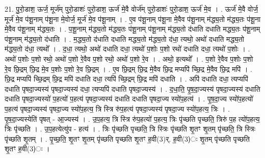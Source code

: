 \documentclass[17pt]{extarticle}
\begin{document}
21. पु॒रो॒डाश॒ ऊर्ज॒ मूर्ज॑म् पुरो॒डाशः॑ पुरो॒डाश॒ ऊर्ज॑ मे॒वै वोर्ज॑म् पुरो॒डाशः॑ पुरो॒डाश॒ ऊर्ज॑ मे॒व । . ऊर्ज॑ मे॒वै वोर्ज॒ मूर्ज॑ मे॒व प॑शू॒नाम् प॑शू॒ना मे॒वोर्ज॒ मूर्ज॑ मे॒व प॑शू॒नाम् । . ए॒व प॑शू॒नाम् प॑शू॒ना मे॒वैव प॑शू॒नाम् म॑द्ध्य॒तो म॑द्ध्य॒तः प॑शू॒ना मे॒वैव प॑शू॒नाम् म॑द्ध्य॒तः । . प॒शू॒नाम् म॑द्ध्य॒तो म॑द्ध्य॒तः प॑शू॒नाम् प॑शू॒नाम् म॑द्ध्य॒तो द॑धाति दधाति मद्ध्य॒तः प॑शू॒नाम् प॑शू॒नाम् म॑द्ध्य॒तो द॑धाति । . म॒द्ध्य॒तो द॑धाति दधाति मद्ध्य॒तो म॑द्ध्य॒तो द॑धा॒ त्यथो॒ अथो॑ दधाति मद्ध्य॒तो म॑द्ध्य॒तो द॑धा॒ त्यथो᳚ । . द॒धा॒ त्यथो॒ अथो॑ दधाति दधा॒ त्यथो॑ प॒शोः प॒शो रथो॑ दधाति दधा॒ त्यथो॑ प॒शोः । . अथो॑ प॒शोः प॒शो रथो॒ अथो॑ प॒शो रे॒वैव प॒शो रथो॒ अथो॑ प॒शो रे॒व । . अथो॒ इत्यथो᳚ । . प॒शो रे॒वैव प॒शोः प॒शो रे॒व छि॒द्रम् छि॒द्र मे॒व प॒शोः प॒शो रे॒व छि॒द्रम् । . ए॒व छि॒द्रम् छि॒द्र मे॒वैव छि॒द्र मप्यपि॑ च्छि॒द्र मे॒वैव छि॒द्र मपि॑ । . छि॒द्र मप्यपि॑ च्छि॒द्रम् छि॒द्र मपि॑ दधाति दधा॒ त्यपि॑ च्छि॒द्रम् छि॒द्र मपि॑ दधाति । . अपि॑ दधाति दधा॒ त्यप्यपि॑ दधाति पृषदा॒ज्यस्य॑ पृषदा॒ज्यस्य॑ दधा॒ त्यप्यपि॑ दधाति पृषदा॒ज्यस्य॑ । . द॒धा॒ति॒ पृ॒ष॒दा॒ज्यस्य॑ पृषदा॒ज्यस्य॑ दधाति दधाति पृषदा॒ज्यस्यो॑ प॒हत्यो॑ प॒हत्य॑ पृषदा॒ज्यस्य॑ दधाति दधाति पृषदा॒ज्य स्यो॑प॒हत्य॑ । . पृ॒ष॒दा॒ज्य स्यो॑प॒हत्यो॑ प॒हत्य॑ पृषदा॒ज्यस्य॑ पृषदा॒ज्य स्यो॑प॒हत्य॒ त्रि स्त्रि रु॑प॒हत्य॑ पृषदा॒ज्यस्य॑ पृषदा॒ज्य स्यो॑प॒हत्य॒ त्रिः । . पृ॒ष॒दा॒ज्यस्येति॑ पृषत् - आ॒ज्यस्य॑ । . उ॒प॒हत्य॒ त्रि स्त्रि रु॑प॒हत्यो॑ प॒हत्य॒ त्रिः पृ॑च्छति पृच्छति॒ त्रिरु॑ प॒ह त्यो॑प॒हत्य॒ त्रिः पृ॑च्छति । . उ॒प॒हत्येत्यु॑प - हत्य॑ । . त्रिः पृ॑च्छति पृच्छति॒ त्रि स्त्रिः पृ॑च्छति शृ॒तꣳ शृ॒तम् पृ॑च्छति॒ त्रि स्त्रिः पृ॑च्छति शृ॒तम् । . पृ॒च्छ॒ति॒ शृ॒तꣳ शृ॒तम् पृ॑च्छति पृच्छति शृ॒तꣳ ह॒वी(3)र्. ह॒वी(3)ः शृ॒तम् पृ॑च्छति पृच्छति शृ॒तꣳ ह॒वी(3)ः । \newline
\end{document}
